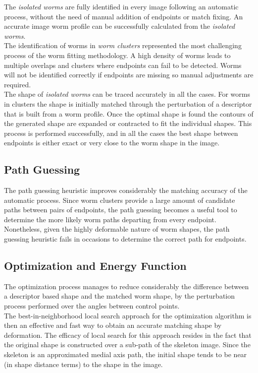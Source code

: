 The \emph{isolated worms} are fully identified in every image following
an automatic process, without the need of manual addition of endpoints
or match fixing. An accurate image worm profile can be successfully 
calculated from the \emph{isolated worms}.\\
The identification of worms in \emph{worm clusters} represented the most 
challenging process of the worm fitting methodology. A high density
of worms leads to multiple overlaps and clusters where endpoints can fail
to be detected. Worms will not be identified correctly if endpoints are
missing so manual adjustments are required.\\
The shape of \emph{isolated worms} can be traced accurately in all the cases.
For worms in clusters the shape is initially matched through the perturbation
of a descriptor that is built from a worm profile. Once the optimal shape
is found the contours of the generated shape are expanded or contracted
to fit the individual shapes. This process is performed successfully, and in
all the cases the best shape between endpoints is either exact or very close
to the worm shape in the image.

\subsection*{Path Guessing}

The path guessing heuristic improves considerably the matching accuracy
of the automatic process. Since worm clusters provide a large amount of 
candidate paths between pairs of endpoints, the path guessing
becomes a useful tool to determine the more likely worm paths departing
from every endpoint. Nonetheless, given the highly deformable nature
of worm shapes, the path guessing heuristic fails in occasions to determine
the correct path for endpoints.

\subsection*{Optimization and Energy Function}
The optimization process manages to reduce considerably the difference
between a descriptor based shape
and the matched worm shape, by the perturbation process performed over
the angles between control points. \\
The best-in-neighborhood local search approach for the optimization algorithm
is then an effective and fast way to obtain an accurate matching
shape by deformation. The efficacy of local search for this approach resides
in the fact that the original shape is constructed over a sub-path of the
skeleton image. Since the skeleton is an approximated medial axis path, 
the initial shape tends to be near (in shape distance terms) to the shape 
in the image.\\

